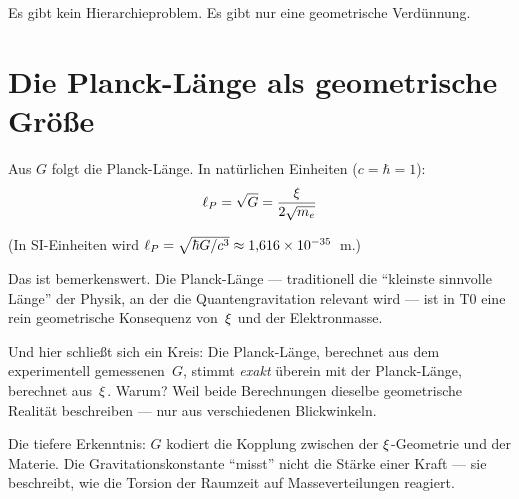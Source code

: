 Es gibt kein Hierarchieproblem. Es gibt nur eine geometrische Verdünnung.

\section{Die Planck-Länge als geometrische Größe}

Aus $G$ folgt die Planck-Länge. In natürlichen Einheiten ($c = \hbar = 1$):
\begin{equation}
\ell_P = \sqrt{G} = \frac{\xi}{2\sqrt{m_e}}
\end{equation}

(In SI-Einheiten wird $\ell_P = \sqrt{\hbar G/c^3} \approx 1{,}616 \times 10^{-35}$~m.)

Das ist bemerkenswert. Die Planck-Länge --- traditionell die \enquote{kleinste sinnvolle Länge} der Physik, an der die Quantengravitation relevant wird --- ist in T0 eine rein geometrische Konsequenz von~$\xi$ und der Elektronmasse.

Und hier schließt sich ein Kreis: Die Planck-Länge, berechnet aus dem experimentell gemessenen~$G$, stimmt \emph{exakt} überein mit der Planck-Länge, berechnet aus~$\xi$. Warum? Weil beide Berechnungen dieselbe geometrische Realität beschreiben --- nur aus verschiedenen Blickwinkeln.

\begin{kerngedanke}
Die tiefere Erkenntnis: $G$ kodiert die Kopplung zwischen der $\xi$-Geometrie und der Materie. Die Gravitationskonstante \enquote{misst} nicht die Stärke einer Kraft --- sie beschreibt, wie die Torsion der Raumzeit auf Masseverteilungen reagiert.
\end{kerngedanke}
